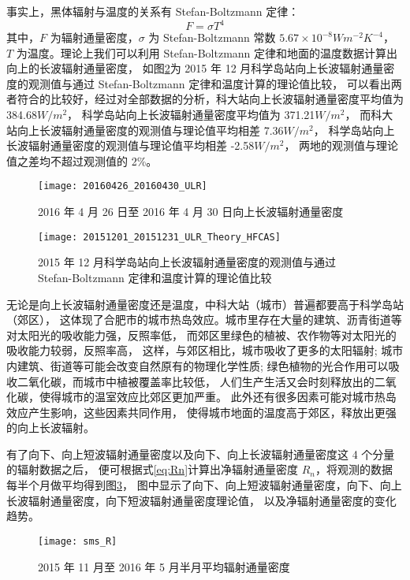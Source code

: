 事实上，黑体辐射与温度的关系有 Stefan-Boltzmann 定律：
\begin{equation}
  F = \sigma T^4
\end{equation}
其中，\(F\) 为辐射通量密度，\(\sigma\) 为 Stefan-Boltzmann 常数 \(5.67\times10^{-8}Wm^{-2}K^{-4}\)，
\(T\) 为温度。理论上我们可以利用 Stefan-Boltzmann 定律和地面的温度数据计算出向上的长波辐射通量密度，
如图\ref{fig:20151201_20151231_ULR_Theory_HFCAS}为
2015 年 12 月科学岛站向上长波辐射通量密度的观测值与通过 Stefan-Boltzmann 定律和温度计算的理论值比较，
可以看出两者符合的比较好，经过对全部数据的分析，科大站向上长波辐射通量密度平均值为 384.68\(W/m^2\)，
科学岛站向上长波辐射通量密度平均值为 371.21\(W/m^2\)，
而科大站向上长波辐射通量密度的观测值与理论值平均相差 7.36\(W/m^2\)，
科学岛站向上长波辐射通量密度的观测值与理论值平均相差 -2.58\(W/m^2\)，
两地的观测值与理论值之差均不超过观测值的 2\%。
\begin{figure}[H]
\centering
\texttt{[image: 20160426\_20160430\_ULR]}
\caption{2016 年 4 月 26 日至 2016 年 4 月 30 日向上长波辐射通量密度}\label{fig:20160426_20160430_ULR}
\end{figure}
\begin{figure}[H]
\centering
\texttt{[image: 20151201\_20151231\_ULR\_Theory\_HFCAS]}
\caption{2015 年 12 月科学岛站向上长波辐射通量密度的观测值与通过 Stefan-Boltzmann 定律和温度计算的理论值比较}\label{fig:20151201_20151231_ULR_Theory_HFCAS}
\end{figure}
无论是向上长波辐射通量密度还是温度，中科大站（城市）普遍都要高于科学岛站（郊区），
这体现了合肥市的城市热岛效应。城市里存在大量的建筑、沥青街道等对太阳光的吸收能力强，反照率低，
而郊区里绿色的植被、农作物等对太阳光的吸收能力较弱，反照率高，
这样，与郊区相比，城市吸收了更多的太阳辐射;
城市内建筑、街道等可能会改变自然原有的物理化学性质;
绿色植物的光合作用可以吸收二氧化碳，而城市中植被覆盖率比较低，
人们生产生活又会时刻释放出的二氧化碳，使得城市的温室效应比郊区更加严重。
此外还有很多因素可能对城市热岛效应产生影响，这些因素共同作用，
使得城市地面的温度高于郊区，释放出更强的向上长波辐射。

有了向下、向上短波辐射通量密度以及向下、向上长波辐射通量密度这 4 个分量的辐射数据之后，
便可根据式\ref{eq:Rn}计算出净辐射通量密度 \(R_n\)，将观测的数据每半个月做平均得到图\ref{fig:sms_R}，
图中显示了向下、向上短波辐射通量密度，向下、向上长波辐射通量密度，向下短波辐射通量密度理论值，
以及净辐射通量密度的变化趋势。
\begin{figure}[H]
\centering
\texttt{[image: sms\_R]}
\caption{2015 年 11 月至 2016 年 5 月半月平均辐射通量密度}\label{fig:sms_R}
\end{figure}

